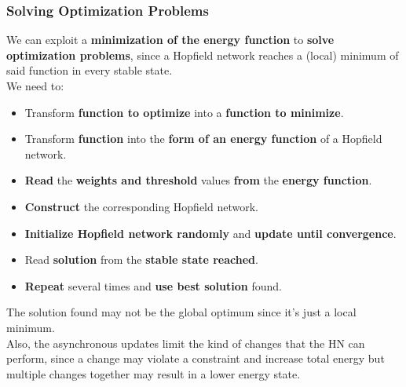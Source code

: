 \documentclass[11pt]{article}
\begin{document}
		\newpage
		
		\subsubsection{Solving Optimization Problems}
		We can exploit a \textbf{minimization of the energy function} to \textbf{solve optimization problems}, since a Hopfield network reaches a (local) minimum of said function in every stable state.\\
		
		We need to:
		\begin{itemize}
			\item Transform \textbf{function to optimize} into a \textbf{function to minimize}.\\
			
			\item Transform \textbf{function} into the \textbf{form of an energy function} of a Hopfield network.\\
			
			\item \textbf{Read} the \textbf{weights and threshold} values \textbf{from} the \textbf{energy function}.\\
			
			\item \textbf{Construct} the corresponding Hopfield network.\\
			
			\item \textbf{Initialize Hopfield network randomly} and \textbf{update until convergence}.\\
			
			\item Read \textbf{solution} from the \textbf{stable state reached}.\\
			
			\item \textbf{Repeat} several times and \textbf{use best solution} found.\\
			
		\end{itemize}
		
		The solution found may not be the global optimum since it's just a local minimum.\\
		
		Also, the asynchronous updates limit the kind of changes that the HN can perform, since a change may violate a constraint and increase total energy but multiple changes together may result in a lower energy state.\\
		
\end{document}
